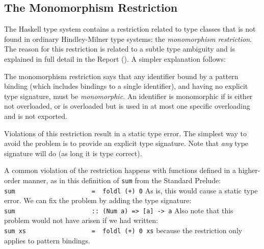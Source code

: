 \subsection{The Monomorphism Restriction}

The Haskell type system contains a restriction related to type classes
that is not found in ordinary Hindley-Milner type systems: the {\em
monomorphism restriction}.  The reason for this restriction is related
to a subtle type ambiguity and is explained in full detail in the
Report ().  A simpler explanation
follows:

The monomorphism restriction says that any identifier bound by a
pattern binding (which includes bindings to a single identifier), and
having no explicit type signature, must be {\em monomorphic}.  An
identifier is monomorphic if is either not overloaded, or is
overloaded but is used in at most one specific overloading and is not
exported.

Violations of this restriction result in a static type error.  The
simplest way to avoid the problem is to provide an explicit type
signature.  Note that {\em any} type signature will do (as long it is
type correct).

A common violation of the restriction happens with functions defined
in a higher-order manner, as in this definition of \mbox{\tt sum} from the
Standard Prelude:
\bprog
\mbox{\tt sum\ \ \ \ \ \ \ \ \ \ \ \ \ \ \ \ \ \ \ \ \ =\ \ foldl\ (+)\ 0}
\eprog 
As is, this would cause a static type error.  We can fix the problem
by adding the type signature:
\bprog
\mbox{\tt sum\ \ \ \ \ \ \ \ \ \ \ \ \ \ \ \ \ \ \ \ \ ::\ (Num\ a)\ =>\ [a]\ ->\ a}
\eprog 
Also note that this problem would not have arisen if we had written:
\bprog
\mbox{\tt sum\ xs\ \ \ \ \ \ \ \ \ \ \ \ \ \ \ \ \ \ =\ \ foldl\ (+)\ 0\ xs}
\eprog 
because the restriction only applies to pattern bindings.



